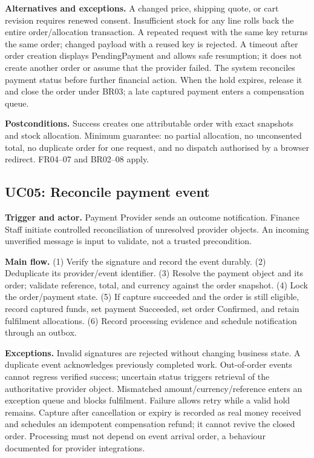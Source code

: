 \textbf{Alternatives and exceptions.} A changed price, shipping quote, or cart revision requires renewed consent. Insufficient stock for any line rolls back the entire order/allocation transaction. A repeated request with the same key returns the same order; changed payload with a reused key is rejected. A timeout after order creation displays PendingPayment and allows safe resumption; it does not create another order or assume that the provider failed. The system reconciles payment status before further financial action. When the hold expires, release it and close the order under BR03; a late captured payment enters a compensation queue.

\textbf{Postconditions.} Success creates one attributable order with exact snapshots and stock allocation. Minimum guarantee: no partial allocation, no unconsented total, no duplicate order for one request, and no dispatch authorised by a browser redirect. FR04--07 and BR02--08 apply.

\subsection{UC05: Reconcile payment event}
\textbf{Trigger and actor.} Payment Provider sends an outcome notification. Finance Staff initiate controlled reconciliation of unresolved provider objects. An incoming unverified message is input to validate, not a trusted precondition.

\textbf{Main flow.} (1) Verify the signature and record the event durably. (2) Deduplicate its provider/event identifier. (3) Resolve the payment object and its order; validate reference, total, and currency against the order snapshot. (4) Lock the order/payment state. (5) If capture succeeded and the order is still eligible, record captured funds, set payment Succeeded, set order Confirmed, and retain fulfilment allocations. (6) Record processing evidence and schedule notification through an outbox.

\textbf{Exceptions.} Invalid signatures are rejected without changing business state. A duplicate event acknowledges previously completed work. Out-of-order events cannot regress verified success; uncertain status triggers retrieval of the authoritative provider object. Mismatched amount/currency/reference enters an exception queue and blocks fulfilment. Failure allows retry while a valid hold remains. Capture after cancellation or expiry is recorded as real money received and schedules an idempotent compensation refund; it cannot revive the closed order. Processing must not depend on event arrival order, a behaviour documented for provider integrations\cite{stripewebhook}.

